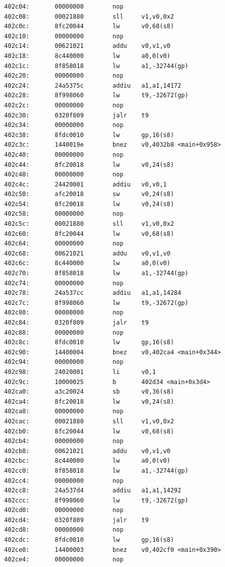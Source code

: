 \documentclass[11pt]{article}
\begin{document}
\begin{verbatim}
  402c04:       00000000        nop
  402c08:       00021880        sll     v1,v0,0x2
  402c0c:       8fc20044        lw      v0,68(s8)
  402c10:       00000000        nop
  402c14:       00621021        addu    v0,v1,v0
  402c18:       8c440000        lw      a0,0(v0)
  402c1c:       8f858018        lw      a1,-32744(gp)
  402c20:       00000000        nop
  402c24:       24a5375c        addiu   a1,a1,14172
  402c28:       8f998060        lw      t9,-32672(gp)
  402c2c:       00000000        nop
  402c30:       0320f809        jalr    t9
  402c34:       00000000        nop
  402c38:       8fdc0010        lw      gp,16(s8)
  402c3c:       1440019e        bnez    v0,4032b8 <main+0x958>
  402c40:       00000000        nop
  402c44:       8fc20018        lw      v0,24(s8)
  402c48:       00000000        nop
  402c4c:       24420001        addiu   v0,v0,1
  402c50:       afc20018        sw      v0,24(s8)
  402c54:       8fc20018        lw      v0,24(s8)
  402c58:       00000000        nop
  402c5c:       00021880        sll     v1,v0,0x2
  402c60:       8fc20044        lw      v0,68(s8)
  402c64:       00000000        nop
  402c68:       00621021        addu    v0,v1,v0
  402c6c:       8c440000        lw      a0,0(v0)
  402c70:       8f858018        lw      a1,-32744(gp)
  402c74:       00000000        nop
  402c78:       24a537cc        addiu   a1,a1,14284
  402c7c:       8f998060        lw      t9,-32672(gp)
  402c80:       00000000        nop
  402c84:       0320f809        jalr    t9
  402c88:       00000000        nop
  402c8c:       8fdc0010        lw      gp,16(s8)
  402c90:       14400004        bnez    v0,402ca4 <main+0x344>
  402c94:       00000000        nop
  402c98:       24020001        li      v0,1
  402c9c:       10000025        b       402d34 <main+0x3d4>
  402ca0:       a3c20024        sb      v0,36(s8)
  402ca4:       8fc20018        lw      v0,24(s8)
  402ca8:       00000000        nop
  402cac:       00021880        sll     v1,v0,0x2
  402cb0:       8fc20044        lw      v0,68(s8)
  402cb4:       00000000        nop
  402cb8:       00621021        addu    v0,v1,v0
  402cbc:       8c440000        lw      a0,0(v0)
  402cc0:       8f858018        lw      a1,-32744(gp)
  402cc4:       00000000        nop
  402cc8:       24a537d4        addiu   a1,a1,14292
  402ccc:       8f998060        lw      t9,-32672(gp)
  402cd0:       00000000        nop
  402cd4:       0320f809        jalr    t9
  402cd8:       00000000        nop
  402cdc:       8fdc0010        lw      gp,16(s8)
  402ce0:       14400003        bnez    v0,402cf0 <main+0x390>
  402ce4:       00000000        nop

\end{verbatim}
\end{document}
